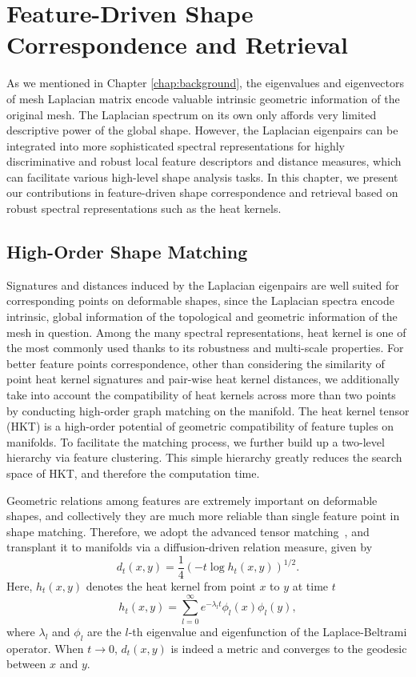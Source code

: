 \chapter{Feature-Driven Shape Correspondence and Retrieval}
\label{chap:matching}

As we mentioned in Chapter \ref{chap:background}, the eigenvalues and eigenvectors of mesh Laplacian matrix
encode valuable intrinsic geometric information of the original mesh. The Laplacian
spectrum on its own only affords very limited descriptive power of the global shape.
However, the Laplacian eigenpairs can be integrated into more sophisticated spectral
representations for highly discriminative and robust local feature descriptors and
distance measures, which can facilitate various high-level shape analysis tasks.
In this chapter, we present our contributions in feature-driven shape correspondence and
retrieval based on robust spectral representations such as the heat kernels.

\section{High-Order Shape Matching}
Signatures and distances induced by the Laplacian eigenpairs are well suited for corresponding points on
deformable shapes, since the Laplacian spectra encode intrinsic, global information of the topological and
geometric information of the mesh in question. Among the many spectral representations, heat kernel is one
of the most commonly used thanks to its robustness and multi-scale properties. For better feature points
correspondence, other than considering the similarity of point heat kernel signatures
and pair-wise heat kernel distances, we additionally take into account the compatibility of heat kernels across
more than two points by conducting high-order graph matching on the manifold. The heat kernel tensor (HKT) is a
high-order potential of geometric compatibility of feature tuples on manifolds. To facilitate the matching process,
we further build up a two-level hierarchy via feature clustering. This simple hierarchy greatly reduces the search
space of HKT, and therefore the computation time.

Geometric relations among features are extremely important on deformable shapes, and collectively they are much
more reliable than single feature point in shape matching. Therefore, we adopt the advanced tensor
matching~\cite{Duchenne:CVPR:2011}, and transplant it to manifolds via a diffusion-driven relation measure, given by
\begin{equation}
d_{t}(x,y)=\frac{1}{4}(-t\log h_{t}(x,y))^{1/2}.
\end{equation}
Here, $h_t(x,y)$ denotes the heat kernel from point $x$ to $y$ at time $t$
\begin{equation}
h_t(x,y)=\sum_{l=0}^{\infty}e^{-\lambda_l t}\phi_l(x)\phi_l(y),
\end{equation}
where $\lambda_l$ and $\phi_l$ are the $l$-th eigenvalue and eigenfunction of the Laplace-Beltrami operator. When $t\to 0$, $d_{t}(x,y)$ is indeed a metric and converges to the geodesic between $x$ and $y$.


